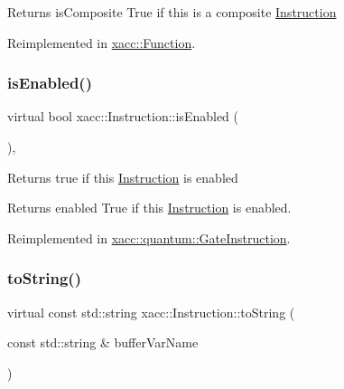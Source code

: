 \begin{DoxyReturn}{Returns}
is\+Composite True if this is a composite \hyperlink{a02460}{Instruction} 
\end{DoxyReturn}


Reimplemented in \hyperlink{a02456_aa75500c657b5c3e0e36213e1506aad97}{xacc\+::\+Function}.

\mbox{\label{a02460_ad02a1cf7220577124720b7a51424cea7}} 
\subsubsection{\texorpdfstring{is\+Enabled()}{isEnabled()}}
{\footnotesize\ttfamily virtual bool xacc\+::\+Instruction\+::is\+Enabled (\begin{DoxyParamCaption}{ }\end{DoxyParamCaption})\hspace{0.3cm}{\ttfamily [inline]}, {\ttfamily [virtual]}}

Returns true if this \hyperlink{a02460}{Instruction} is enabled

\begin{DoxyReturn}{Returns}
enabled True if this \hyperlink{a02460}{Instruction} is enabled. 
\end{DoxyReturn}


Reimplemented in \hyperlink{a01276_a0a821be322b0c848b01c55f91fc8f484}{xacc\+::quantum\+::\+Gate\+Instruction}.

\mbox{\label{a02460_ae94c2d089908294c1d410b14c96817ae}} 
\subsubsection{\texorpdfstring{to\+String()}{toString()}}
{\footnotesize\ttfamily virtual const std\+::string xacc\+::\+Instruction\+::to\+String (\begin{DoxyParamCaption}\item[{const std\+::string \&}]{buffer\+Var\+Name }\end{DoxyParamCaption})\hspace{0.3cm}{\ttfamily [pure virtual]}}

